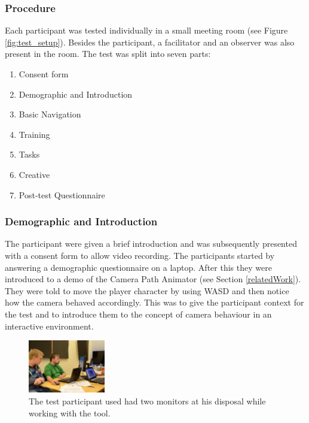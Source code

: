 \subsubsection{Procedure}
Each participant was tested individually in a small meeting room (see Figure \ref{fig:test_setup}). Besides the participant, a facilitator and an observer was also present in the room. The test was split into seven parts:

\begin{enumerate}
\item Consent form
\item Demographic and Introduction
\item Basic Navigation
\item Training
\item Tasks
\item Creative
\item Post-test Questionnaire
\end{enumerate} 

\subsubsection{Demographic and Introduction} %
The participant were given a brief introduction and was subsequently presented with a consent form to allow video recording. The participants started by answering a demographic questionnaire on a laptop. After this they were introduced to a demo of the Camera Path Animator (see Section \ref{relatedWork}). They were told to move the player character by using WASD and then notice how the camera behaved accordingly. This was to give the participant context for the test and to introduce them to the concept of camera behaviour in an interactive environment. 

\begin{figure}[htbp]
\centering
\includegraphics[width=0.3\textwidth]{Pics/test_setup}
\caption{The test participant used had two monitors at his disposal while working with the tool.}
\label{fig:framingConcept}
\end{figure}

